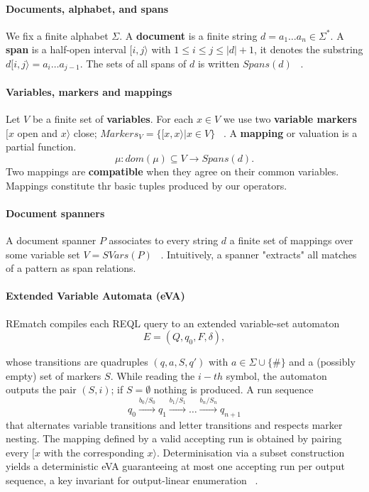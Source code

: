 
\medskip
\noindent
\paragraph{Documents, alphabet, and spans} We fix a finite alphabet $\Sigma$. A \textbf{document} is a finite string $d = a_1 \dots a_n \in \Sigma^{*}$. A \textbf{span} is a half-open interval $[i, j \rangle$ with $1 \leq i \leq j \leq |d| +1$, it denotes the substring $d[i, j\rangle = a_i\dots a_{j-1}$. The sets of all spans of $d$ is written $Spans(d)$ ~\cite{FaginKRT15}.

\paragraph{Variables, markers and mappings} Let $V$ be a finite set of \textbf{variables}. For each $x\in V$ we use two \textbf{variable markers} $[x$ open and $x\rangle$ close; $Markers_V = \{ [x,x\rangle | x \in V\}$ ~\cite{FlorenzanoRUVV20}. A \textbf{mapping} or valuation is a partial function.
$$
\mu : dom(\mu) \subseteq V \rightarrow Spans(d).
$$
Two mappings are \textbf{compatible} when they agree on their common variables. Mappings constitute thr basic tuples produced by our operators.

\paragraph{Document spanners} A document spanner $P$ associates to every string $d$ a finite set of mappings over some variable set $V = SVars(P)$ ~\cite{FaginKRT15}. Intuitively, a spanner "extracts" all matches of a pattern as span relations.

\paragraph{Extended Variable Automata (eVA)} REmatch compiles each REQL query to an extended variable-set automaton 
$$
E = (Q, q_0, F, \delta),
$$

whose transitions are quadruples $(q, a, S, q')$ with $a \in \Sigma \cup \{\#\}$ and a (possibly empty) set of markers $S$. While reading the $i-th$ symbol, the automaton outputs the pair $(S,i)$; if $S = \emptyset$ nothing is produced. A run sequence
$$
q_0 \xrightarrow{b_0/S_0} q_1 \xrightarrow{b_1/S_1} \dots \xrightarrow{b_n/S_n} q_{n+1}
$$
that alternates variable transitions and letter transitions and respects marker nesting. The mapping defined by a valid accepting run is obtained by pairing every $[x$ with the corresponding $x\rangle$. Determinisation via a subset construction yields a deterministic eVA guaranteeing at most one accepting run per output sequence, a key invariant for output-linear enumeration ~\cite{FaginKRT15}.

